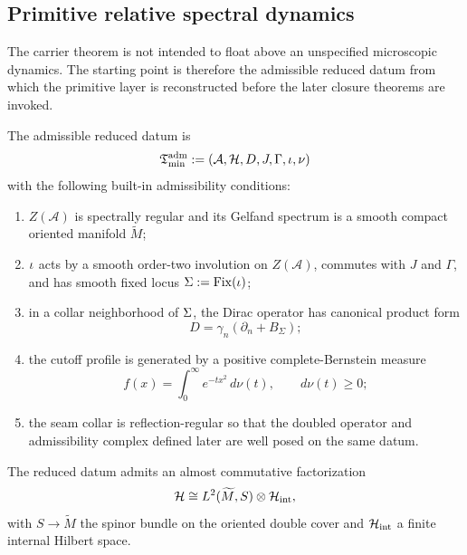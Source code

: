 \subsection{Primitive relative spectral dynamics}

The carrier theorem is not intended to float above an unspecified microscopic dynamics.
The starting point is therefore the admissible reduced datum from which the primitive layer is
reconstructed before the later closure theorems are invoked.

\begin{definition}
\label{def:reduced-theorem-datum}
The admissible reduced datum is
\[
\mathfrak T_{\mathrm{min}}^{\mathrm{adm}}:=(\mathcal A,\mathcal H,D,J,\Gamma,\iota,\nu)
\]
with the following built-in admissibility conditions:
\begin{enumerate}[label=(\roman*), leftmargin=1.5em, topsep=3pt, itemsep=2pt]
    \item $Z(\mathcal A)$ is spectrally regular and its Gelfand spectrum is a smooth compact oriented manifold $\widetilde M$;
    \item $\iota$ acts by a smooth order-two involution on $Z(\mathcal A)$, commutes with $J$ and $\Gamma$, and has smooth fixed locus $\Sigma:=\mathrm{Fix}(\iota)$;
    \item in a collar neighborhood of $\Sigma$, the Dirac operator has canonical product form
    \[
    D=\gamma_n(\partial_n+B_\Sigma);
    \]
    \item the cutoff profile is generated by a positive complete-Bernstein measure
    \begin{equation}
    \label{eq:bernstein-test-function}
    f(x)=\int_0^\infty e^{-t x^2}\,d\nu(t),
    \qquad
    d\nu(t)\ge 0;
    \end{equation}
    \item the seam collar is reflection-regular so that the doubled operator and admissibility complex defined later are well posed on the same datum.
\end{enumerate}
\end{definition}

\begin{assumption}
\label{ass:almost-commutative-factorization}
The reduced datum admits an almost commutative factorization
\[
\mathcal H\cong L^2(\widetilde M,S)\otimes \mathcal H_{\mathrm{int}},
\]
with $S\to\widetilde M$ the spinor bundle on the oriented double cover and $\mathcal H_{\mathrm{int}}$ a finite
internal Hilbert space.
\end{assumption}


